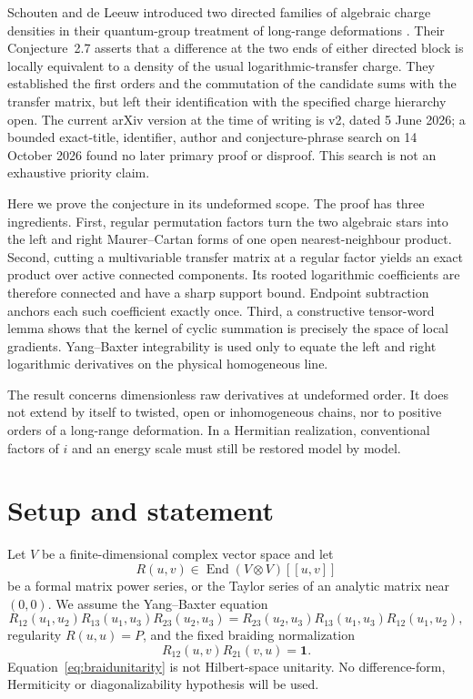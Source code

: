 \documentclass[11pt,a4paper]{article}
\theoremstyle{definition}
\theoremstyle{remark}
\newcommand{\End}{\operatorname{End}}
\begin{document}
Schouten and de Leeuw introduced two directed families of algebraic charge densities
in their quantum-group treatment of long-range deformations
\cite{SchoutenDeLeeuw2026}.  Their Conjecture~2.7 asserts that a difference at the two
ends of either directed block is locally equivalent to a density of the usual
logarithmic-transfer charge.  They established the first orders and the commutation of
the candidate sums with the transfer matrix, but left their identification with the
specified charge hierarchy open.  The current arXiv version at the time of writing is
v2, dated 5 June 2026; a bounded exact-title, identifier, author and conjecture-phrase
search on 14 October 2026 found no later primary proof or disproof.  This search is not
an exhaustive priority claim.

Here we prove the conjecture in its undeformed scope.  The proof has three ingredients.
First, regular permutation factors turn the two algebraic stars into the left and right
Maurer--Cartan forms of one open nearest-neighbour product.  Second, cutting a
multivariable transfer matrix at a regular factor yields an exact product over active
connected components.  Its rooted logarithmic coefficients are therefore connected
and have a sharp support bound.  Endpoint subtraction anchors each such coefficient
exactly once.  Third, a constructive tensor-word lemma shows that the kernel of cyclic
summation is precisely the space of local gradients.  Yang--Baxter integrability is
used only to equate the left and right logarithmic derivatives on the physical
homogeneous line.

The result concerns dimensionless raw derivatives at undeformed order.  It does not
extend by itself to twisted, open or inhomogeneous chains, nor to positive orders of a
long-range deformation.  In a Hermitian realization, conventional factors of $i$ and
an energy scale must still be restored model by model.

\section{Setup and statement}

Let $V$ be a finite-dimensional complex vector space and let
\begin{equation}
 R(u,v)\in\End(V\otimes V)[[u,v]]
\end{equation}
be a formal matrix power series, or the Taylor series of an analytic matrix near
$(0,0)$.  We assume the Yang--Baxter equation
\begin{equation}
 R_{12}(u_1,u_2)R_{13}(u_1,u_3)R_{23}(u_2,u_3)
 =R_{23}(u_2,u_3)R_{13}(u_1,u_3)R_{12}(u_1,u_2),
 \label{eq:ybe}
\end{equation}
regularity $R(u,u)=P$, and the fixed braiding normalization
\begin{equation}
 R_{12}(u,v)R_{21}(v,u)=\mathbf 1.
 \label{eq:braidunitarity}
\end{equation}
Equation~\eqref{eq:braidunitarity} is not Hilbert-space unitarity.  No difference-form,
Hermiticity or diagonalizability hypothesis will be used.
\end{document}
